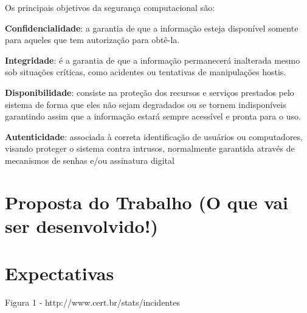\documentclass[
	12pt,				%
	openright,			%
	oneside,
	a4paper,			%
	english,			%
	french,				%
	spanish,			%
	brazil				%
	]{abntex2}
\begin{document}
Os principais objetivos da segurança computacional são:

\textbf{Confidencialidade}: a garantia de que a informação esteja disponível somente para aqueles que tem autorização para obtê-la.

\textbf{Integridade}: é a garantia de que a informação permanecerá inalterada mesmo sob situações críticas, como acidentes ou tentativas de manipulações hostis.

\textbf{Disponibilidade}: consiste na proteção dos recursos e serviços prestados pelo sistema de forma que eles não sejam degradados ou se tornem indisponíveis garantindo assim que a informação estará sempre acessível e pronta para o uso.

\textbf{Autenticidade}: associada à correta identificação de usuários ou computadores, visando proteger o sistema contra intrusos, normalmente garantida através de mecanismos de senhas e/ou assinatura digital 

\chapter[Proposta do Trabalho]{Proposta do Trabalho (O que vai ser desenvolvido!)}


\chapter[Expectativas]{Expectativas}


\postextual


Figura 1 - http://www.cert.br/stats/incidentes
\end{document}
